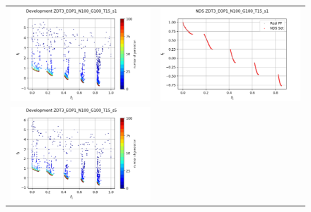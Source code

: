 
\begin{figure}[H]
    \centering
    \begin{tabular}{c c}
    \includegraphics[scale=0.45]{figures/ZDT3_EOP1_N100_G100_T15/s1_dev.png} &
    \includegraphics[scale=0.45]{figures/ZDT3_EOP1_N100_G100_T15/s1_nds.png}\\
    \includegraphics[scale=0.45]{figures/ZDT3_EOP1_N100_G100_T15/s5_dev.png} &

\end{tabular}
\end{figure}

